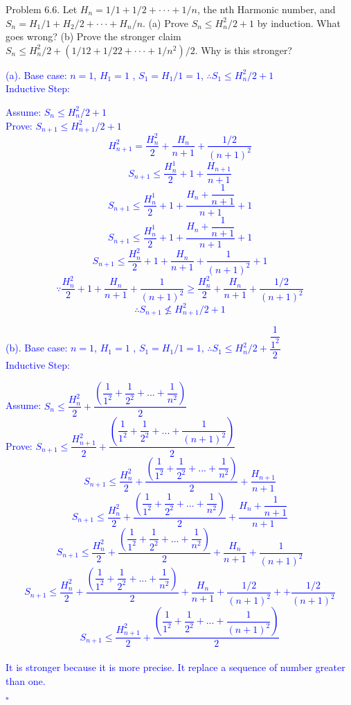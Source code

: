 \documentclass{article}
\begin{document}
\clearpage

\begin{addmargin}[2em]{2em}
Problem 6.6. Let $H_n = 1/1 + 1/2 +···+ 1/n$, the nth Harmonic number, and $S_n = H_1/1 + H_2/2 +···+ H_n/n$. (a) Prove $S_n \leq H_n^2/2 + 1$ by induction. What goes wrong? (b) Prove the stronger claim $S_n \leq H_n^2/2 + (1/12 + 1/22 +···+ 1/n^2)/2$. Why is this stronger? 
	\textcolor{blue}{
		\begin{addmargin}[2em]{1em}
			(a). Base case: $n= 1$, $H_1 = 1$ , $S_1 = H_1/1 =1$, $\therefore S_1 \leq H_n^2/2+1$\\
			Inductive Step:
			\begin{addmargin}[2.35cm]{0cm}
				Assume: $S_n \leq H_n^2/2 + 1$\\
				Prove: $S_{n+1} \leq H_{n+1}^2/2 + 1$
				$$H_{n+1}^2=\dfrac{H_{n}^2}{2}+\dfrac{H_n}{n+1}+\dfrac{1/2}{(n+1)^2}$$
				$$S_{n+1} \leq \dfrac{H_n^1}{2}+1+\dfrac{H_{n+1}}{n+1}$$
				$$S_{n+1} \leq \dfrac{H_n^1}{2}+1+\dfrac{H_{n}+\dfrac{1}{n+1}}{n+1}+1$$
				$$S_{n+1} \leq \dfrac{H_n^1}{2}+1+\dfrac{H_{n}+\dfrac{1}{n+1}}{n+1}+1$$
				$$S_{n+1} \leq \dfrac{H_n^2}{2}+1+\dfrac{H_{n}}{n+1}+\dfrac{1}{(n+1)^2}+1$$
				$$\because \dfrac{H_n^2}{2}+1+\dfrac{H_{n}}{n+1}+\dfrac{1}{(n+1)^2} \geq  \dfrac{H_{n}^2}{2}+\dfrac{H_n}{n+1}+\dfrac{1/2}{(n+1)^2}$$
				$$\therefore S_{n+1} \nleq H_{n+1}^2/2 + 1$$
			\end{addmargin}
		\begin{spacing}{2.2}
				(b). Base case: $n= 1$, $H_1 = 1$ , $S_1 = H_1/1 =1$, $\therefore S_1 \leq H_n^2/2+\dfrac{\dfrac{1}{1^2}}{2}$\\
				Inductive Step:
				\begin{addmargin}[2cm]{0cm}
					Assume: $S_n \leq \dfrac{H_n^2}{2}+\dfrac{(\dfrac{1}{1^2}+\dfrac{1}{2^2}+...+\dfrac{1}{n^2})}{2}$\\
					Prove: $S_{n+1} \leq \dfrac{H_{n+1}^2}{2}+\dfrac{(\dfrac{1}{1^2}+\dfrac{1}{2^2}+...+\dfrac{1}{(n+1)^2})}{2}$
					$$S_{n+1} \leq \dfrac{H_n^2}{2}+\dfrac{(\dfrac{1}{1^2}+\dfrac{1}{2^2}+...+\dfrac{1}{n^2})}{2}+\dfrac{H_{n+1}}{n+1}$$
					$$S_{n+1} \leq \dfrac{H_n^2}{2}+\dfrac{(\dfrac{1}{1^2}+\dfrac{1}{2^2}+...+\dfrac{1}{n^2})}{2}+\dfrac{H_{n}+\dfrac{1}{n+1}}{n+1}$$
					$$S_{n+1} \leq \dfrac{H_n^2}{2}+\dfrac{(\dfrac{1}{1^2}+\dfrac{1}{2^2}+...+\dfrac{1}{n^2})}{2}+\dfrac{H_{n}}{n+1}+\dfrac{1}{(n+1)^2}$$
					$$S_{n+1} \leq \dfrac{H_n^2}{2}+\dfrac{(\dfrac{1}{1^2}+\dfrac{1}{2^2}+...+\dfrac{1}{n^2})}{2}+\dfrac{H_{n}}{n+1}+\dfrac{1/2}{(n+1)^2}++\dfrac{1/2}{(n+1)^2}$$
					$$S_{n+1} \leq \dfrac{H_{n+1}^2}{2}+\dfrac{(\dfrac{1}{1^2}+\dfrac{1}{2^2}+...+\dfrac{1}{(n+1)^2})}{2}$$\\
					It is stronger because it is more precise. It replace a sequence of number greater than one.
						\begin{flushright}
						$\square$
					\end{flushright}
				\end{addmargin}
		\end{spacing}
		\end{addmargin}
	}
\end{addmargin}
\end{document}
